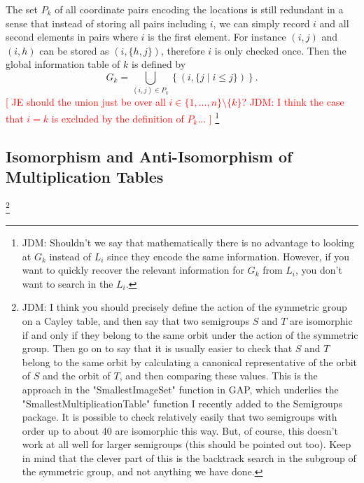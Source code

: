 \documentclass{amsart}
\newcommand{\todo}[1]{\textcolor{red}{ \small \textsf{[ #1 ]} \normalsize}}
\theoremstyle{plain}
\theoremstyle{definition}
\begin{document}
The set $P_k$ of all coordinate pairs encoding the locations is still redundant in a sense that instead of storing all pairs including $i$, we can simply record $i$ and all second  elements in  pairs where $i$ is the first element.
For instance $(i,j)$ and $(i,h)$ can be stored as $(i,\{h,j\})$, therefore $i$ is only checked once.
Then the  global information table of $k$ is defined by
$$G_k=\bigcup_{(i,j)\in P_k} \left\{ (i,\{j\mid i\leq j\})\right\}.$$
\todo{JE should the union just be over all
$i\in\{1,\ldots,n\}\setminus\{k\}$? JDM: I think the case that $i=k$ is excluded
by the definition of $P_k$...}
\footnote{JDM: Shouldn't we say that mathematically there is no advantage to
looking at $G_k$ instead of $L_i$ since they encode the same information.
However, if you want to quickly recover the relevant information for $G_k$ from
$L_i$, you don't want to search in the $L_i$.}

\subsection{Isomorphism and Anti-Isomorphism of Multiplication Tables}
\footnote{JDM: I think you should precisely define the action of the symmetric
  group on a Cayley table, and then say that two semigroups
  $S$ and $T$ are isomorphic if and only if they belong to the same orbit under
  the action of the symmetric group. Then go on to say that it is usually easier
  to check that $S$ and $T$ belong to the same orbit by calculating a canonical
  representative of the orbit of $S$ and the orbit of $T$, and then comparing
  these values. This is the approach in the "SmallestImageSet" function in GAP,
  which underlies the "SmallestMultiplicationTable" function I recently added to
  the Semigroups package. It is possible to check relatively easily that two
  semigroups with order up to about 40 are isomorphic this way. But, of course,
this doesn't work at all well for larger semigroups (this should be pointed
out too). Keep in mind that the clever part of this is the backtrack search in
the subgroup of the symmetric group, and not anything we have done.} 
\end{document}
